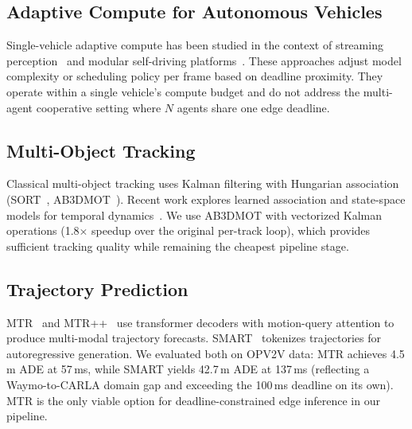 \subsection{Adaptive Compute for Autonomous Vehicles}

Single-vehicle adaptive compute has been studied in the context of
streaming perception~\cite{li2020streaming} and modular
self-driving platforms~\cite{gog2022pylot}.  These approaches
adjust model complexity or scheduling policy per frame based on
deadline proximity.  They operate within a single vehicle's compute
budget and do not address the multi-agent cooperative setting where
$N$ agents share one edge deadline.

\subsection{Multi-Object Tracking}

Classical multi-object tracking uses Kalman filtering with Hungarian
association (SORT~\cite{Bewley2016_sort},
AB3DMOT~\cite{ab3dmotTracker2020}).  Recent work explores learned
association and state-space models for temporal
dynamics~\cite{mambatrack2024, trackssm2024}.
We use AB3DMOT with vectorized Kalman operations (1.8$\times$ speedup
over the original per-track loop), which provides sufficient tracking
quality while remaining the cheapest pipeline stage.

\subsection{Trajectory Prediction}

MTR~\cite{shi2022mtr} and MTR++~\cite{shi2023mtrpp} use transformer
decoders with motion-query attention to produce multi-modal trajectory
forecasts.
SMART~\cite{wu2024smart} tokenizes trajectories for autoregressive
generation.  We evaluated both on OPV2V data: MTR achieves 4.5\,m ADE
at 57\,ms, while SMART yields 42.7\,m ADE at 137\,ms (reflecting a
Waymo-to-CARLA domain gap and exceeding the 100\,ms deadline on its
own).  MTR is the only viable option for deadline-constrained edge
inference in our pipeline.
